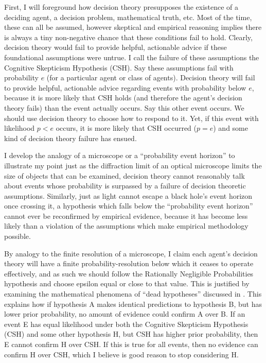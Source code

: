\documentclass{article}
\begin{document}
First, I will foreground how decision theory presupposes the existence of a deciding agent, a decision problem, mathematical truth, etc. Most of the time, these can all be assumed, however skeptical and empirical reasoning implies there is always a tiny non-negative chance that these conditions fail to hold. Clearly, decision theory would fail to provide helpful, actionable advice if these foundational assumptions were untrue. I call the failure of these assumptions the Cognitive Skepticism Hypothesis (CSH). Say these assumptions fail with probability \(e\) (for a particular agent or class of agents). Decision theory will fail to provide helpful, actionable advice regarding events with probability below \(e\), because it is more likely that CSH holds (and therefore the agent's decision theory fails) than the event actually occurs. Say this other event occurs. We should use decision theory to choose how to respond to it. Yet, if this event with likelihood \(p<e\) occurs, it is more likely that CSH occurred (\(p=e\)) and some kind of decision theory failure has ensued.

I develop the analogy of a microscope or a ``probability event horizon'' to illustrate my point \textemdash{} just as the diffraction limit of an optical microscope limits the size of objects that can be examined, decision theory cannot reasonably talk about events whose probability is surpassed by a failure of decision theoretic assumptions. Similarly, just as light cannot escape a black hole's event horizon once crossing it, a hypothesis which falls below the ``probability event horizon'' cannot ever be reconfirmed by empirical evidence, because it has become less likely than a violation of the assumptions which make empirical methodology possible. 

By analogy to the finite resolution of a microscope, I claim each agent's decision theory will have a finite probability-resolution below which it ceases to operate effectively, and as such we should follow the Rationally Negligible Probabilities hypothesis and choose epsilon equal or close to that value. This is justified by examining the mathematical phenomena of ``dead hypotheses'' discussed in \citet{jaynes2003probability}. This explains how if hypothesis A makes identical predictions to hypothesis B, but has lower prior probability, no amount of evidence could confirm A over B. If an event E has equal likelihood under both the Cognitive Skepticism Hypothesis (CSH) and some other hypothesis H, but CSH has higher prior probability, then E cannot confirm H over CSH. If this is true for all events, then no evidence can confirm H over CSH, which I believe is good reason to stop considering H.
\end{document}
